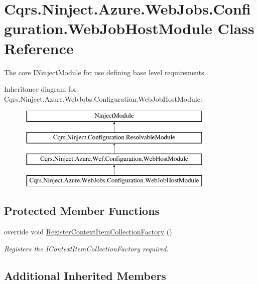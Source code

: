 \hypertarget{classCqrs_1_1Ninject_1_1Azure_1_1WebJobs_1_1Configuration_1_1WebJobHostModule}{}\section{Cqrs.\+Ninject.\+Azure.\+Web\+Jobs.\+Configuration.\+Web\+Job\+Host\+Module Class Reference}
\label{classCqrs_1_1Ninject_1_1Azure_1_1WebJobs_1_1Configuration_1_1WebJobHostModule}


The core I\+Ninject\+Module for use defining base level requirements.  


Inheritance diagram for Cqrs.\+Ninject.\+Azure.\+Web\+Jobs.\+Configuration.\+Web\+Job\+Host\+Module\+:\begin{figure}[H]
\begin{center}
\leavevmode
\includegraphics[height=4.000000cm]{classCqrs_1_1Ninject_1_1Azure_1_1WebJobs_1_1Configuration_1_1WebJobHostModule}
\end{center}
\end{figure}
\subsection*{Protected Member Functions}
\begin{DoxyCompactItemize}
\item 
override void \hyperlink{classCqrs_1_1Ninject_1_1Azure_1_1WebJobs_1_1Configuration_1_1WebJobHostModule_a478ea88f9dd4740ffd11b5d169683e2b_a478ea88f9dd4740ffd11b5d169683e2b}{Register\+Context\+Item\+Collection\+Factory} ()
\begin{DoxyCompactList}\small\item\em Registers the I\+Context\+Item\+Collection\+Factory required. \end{DoxyCompactList}\end{DoxyCompactItemize}
\subsection*{Additional Inherited Members}


